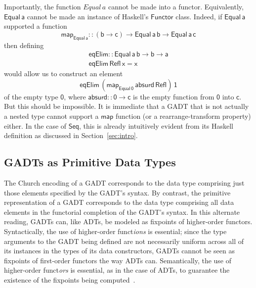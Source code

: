 \documentclass[acmsmall,screen,review,anonymous]{acmart}
\theoremstyle{definition}
\begin{document}
Importantly, the function $\mathit{Equal}\,a$ cannot be made into a
functor. Equivalently, $\mathsf{Equal\,a}$ cannot be made an instance
of Haskell's $\mathsf{Functor}$ class. Indeed, if $\mathsf{Equal\,a}$
supported a function
\[\mathsf{map_{Equal\,a} :: (b \to c) \to Equal\,a\,b \to
  Equal\,a\,c}\]
then defining
\[\begin{array}{l}
\mathsf{eqElim :: Equal\, a\, b \to b \to a}\\
\mathsf{eqElim\, Refl\, x = x} 
\end{array}\]
would allow us to construct
an element
\[\mathsf{eqElim\, (map_{Equal\,0}\, absurd\, Refl)\, 1}\]
of the empty type $\mathsf{0}$, where $\mathsf{absurd :: 0 \to c}$ is
the
empty function from  $\mathsf{0}$
into
$\mathsf{c}$.
But this should be impossible. It is immediate that a GADT that is not
actually a nested type cannot support a $\mathsf{map}$ function (or a
rearrange-transform property) either. In the case of $\mathsf{Seq}$,
this is already intuitively evident from its Haskell definition as
discussed in Section~\ref{sec:intro}.

\subsection{GADTs as Primitive Data Types}\label{sec:prim-gadts}

The Church encoding of a GADT corresponds to the data type comprising
just those elements specified by the GADT's syntax. By contrast, the
primitive representation of a GADT corresponds to the data type
comprising all data elements in the functorial completion of the
GADT's syntax. In this alternate reading, GADTs can, like ADTs, be
modeled as fixpoints of higher-order functors. Syntactically, the use
of higher-order funct{\em ions} is essential; since the type arguments
to the GADT being defined are not necessarily uniform across all of
its instances in the types of its data constructors, GADTs cannot be
seen as fixpoints of first-order functors the way ADTs
can. Semantically, the use of higher-order funct{\em ors} is
essential, as in the case of ADTs, to guarantee the existence of the
fixpoints being computed~\cite{tfca}.
\end{document}
